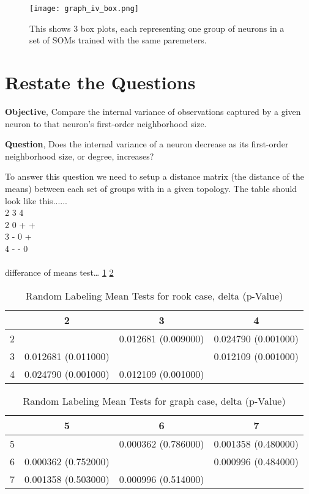 \begin{figure}
\centering
\texttt{[image: graph\_iv\_box.png]}
\caption{This shows 3 box plots, each representing one group of neurons in a set
of SOMs trained with the same paremeters.}
\label{fGraphIV}
\end{figure}



\section{Restate the Questions}
\textbf{Objective}, Compare the internal variance of observations captured by a given
neuron to that neuron's first-order neighborhood size.

\textbf{Question}, Does the internal variance of a neuron decrease as its first-order
neighborhood size, or degree, increases?


To answer this question we need to setup a distance matrix (the distance of the
means) between each set of groups with in a given topology.  The table should
look like this...... 
\\
  2 3 4\\
2 0 + +\\
3 - 0 +\\
4 - - 0\\
\\
differance of means test\ldots
\ref{randomLabelTableRook}
\ref{randomLabelTableGraph}

\begin{table}
\caption{Random Labeling Mean Tests for rook case,  delta (p-Value)}
\label{randomLabelTableRook}
\begin{tabular}{|c||c|c|c|}
\hline
&2&3&4\\
\hline
\hline
2& & 0.012681 (0.009000)& 0.024790 (0.001000)\\
\hline
3& 0.012681 (0.011000)& & 0.012109 (0.001000)\\
\hline
4& 0.024790 (0.001000)& 0.012109 (0.001000)& \\
\hline
\end{tabular} \end{table}


\begin{table}
\caption{Random Labeling Mean Tests for graph case,  delta (p-Value)}
\label{randomLabelTableGraph}
\begin{tabular}{|c||c|c|c|}
\hline
&5&6&7\\
\hline
\hline
5& & 0.000362 (0.786000)& 0.001358 (0.480000)\\
\hline
6& 0.000362 (0.752000)& & 0.000996 (0.484000)\\
\hline
7& 0.001358 (0.503000)& 0.000996 (0.514000)& \\
\hline
\end{tabular} \end{table}




